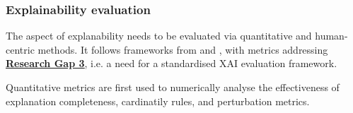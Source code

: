 
\subsubsection*{Explainability evaluation}
The aspect of explanability needs to be evaluated via quantitative and human-centric methods. It follows frameworks from \citep{reddy2023explainable} and \citep{van2024applicability}, with metrics addressing \hyperref[research-gap-3]{\uline{\textbf{Research Gap 3}}}, i.e. a need for a standardised XAI evaluation framework.\newline

\noindent Quantitative metrics are first used to numerically analyse the effectiveness of explanation completeness, cardinatily rules, and perturbation metrics.


